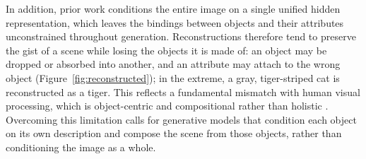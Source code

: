 In addition, prior work conditions the entire image on a single unified hidden representation, which leaves the bindings between objects and their attributes unconstrained throughout generation. Reconstructions therefore tend to preserve the gist of a scene while losing the objects it is made of: an object may be dropped or absorbed into another, and an attribute may attach to the wrong object (Figure~\ref{fig:reconstructed}); in the extreme, a gray, tiger-striped cat is reconstructed as a tiger. This reflects a fundamental mismatch with human visual processing, which is object-centric and compositional rather than holistic \citep{marr1980visual, bracci2023understanding}. Overcoming this limitation calls for generative models that condition each object on its own description and compose the scene from those objects, rather than conditioning the image as a whole.


